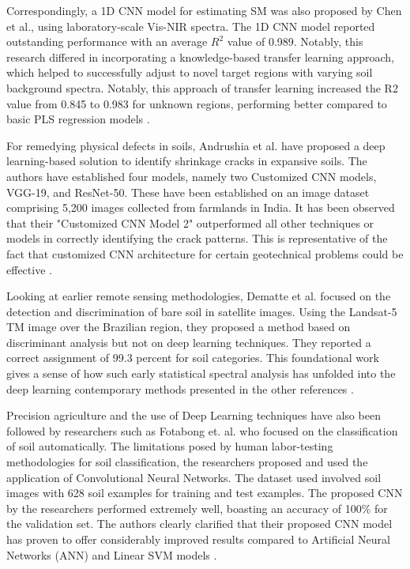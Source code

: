 \documentclass[conference]{IEEEtran}
\begin{document}
Correspondingly, a 1D CNN model for estimating SM was also proposed by Chen et al., using laboratory-scale Vis-NIR spectra. The 1D CNN model reported outstanding performance with an average $R^2$ value of 0.989. Notably, this research differed in incorporating a knowledge-based transfer learning approach, which helped to successfully adjust to novel target regions with varying soil background spectra. Notably, this approach of transfer learning increased the R2 value from 0.845 to 0.983 for unknown regions, performing better compared to basic PLS regression models \cite{b20}.
\vspace{5pt}


For remedying physical defects in soils, Andrushia et al. have proposed a deep learning-based solution to identify shrinkage cracks in expansive soils. The authors have established four models, namely two Customized CNN models, VGG-19, and ResNet-50. These have been established on an image dataset comprising 5,200 images collected from farmlands in India. It has been observed that their "Customized CNN Model 2" outperformed all other techniques or models in correctly identifying the crack patterns. This is representative of the fact that customized CNN architecture for certain geotechnical problems could be effective \cite{b21}.
\vspace{5pt}


Looking at earlier remote sensing methodologies, Dematte et al. focused on the detection and discrimination of bare soil in satellite images. Using the Landsat-5 TM image over the Brazilian region, they proposed a method based on discriminant analysis but not on deep learning techniques. They reported a correct assignment of 99.3 percent for soil categories. This foundational work gives a sense of how such early statistical spectral analysis has unfolded into the deep learning contemporary methods presented in the other references \cite{b22}.
\vspace{5pt}


Precision agriculture and the use of Deep Learning techniques have also been followed by researchers such as Fotabong et. al. who focused on the classification of soil automatically. The limitations posed by human labor-testing methodologies for soil classification, the researchers proposed and used the application of Convolutional Neural Networks. The dataset used involved soil images with 628 soil examples for training and test examples. The proposed CNN by the researchers performed extremely well, boasting an accuracy of 100\% for the validation set. The authors clearly clarified that their proposed CNN model has proven to offer considerably improved results compared to Artificial Neural Networks (ANN) and Linear SVM models \cite{b23}.
\vspace{5pt}
\end{document}
